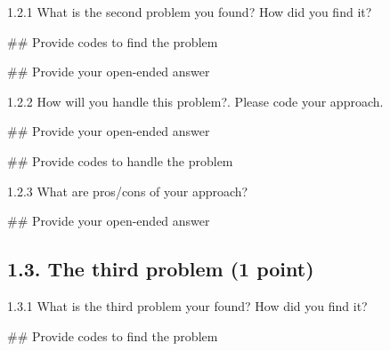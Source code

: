 \documentclass[
  letterpaper,
]{scrbook}
\newenvironment{Shaded}{\begin{snugshade}}{\end{snugshade}}
\newcommand{\CommentTok}[1]{\textcolor[rgb]{0.37,0.37,0.37}{#1}}
\begin{document}
1.2.1 What is the second problem you found? How did you find it?

\begin{Shaded}
\begin{Highlighting}[]
\CommentTok{\#\# Provide codes to find the problem}
\end{Highlighting}
\end{Shaded}

\begin{Shaded}
\begin{Highlighting}[]
\CommentTok{\#\# Provide your open{-}ended answer}
\end{Highlighting}
\end{Shaded}

1.2.2 How will you handle this problem?. Please code your approach.

\begin{Shaded}
\begin{Highlighting}[]
\CommentTok{\#\# Provide your open{-}ended answer}
\end{Highlighting}
\end{Shaded}

\begin{Shaded}
\begin{Highlighting}[]
\CommentTok{\#\# Provide codes to handle the problem}
\end{Highlighting}
\end{Shaded}

1.2.3 What are pros/cons of your approach?

\begin{Shaded}
\begin{Highlighting}[]
\CommentTok{\#\# Provide your open{-}ended answer}
\end{Highlighting}
\end{Shaded}

\subsection*{1.3. The third problem (1
point)}\label{the-third-problem-1-point}

1.3.1 What is the third problem your found? How did you find it?

\begin{Shaded}
\begin{Highlighting}[]
\CommentTok{\#\# Provide codes to find the problem }
\end{Highlighting}
\end{Shaded}
\end{document}
